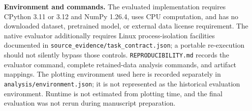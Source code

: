 \documentclass{article}
\begin{document}
\textbf{Environment and commands.} The evaluated implementation requires CPython 3.11 or 3.12 and NumPy 1.26.4, uses CPU computation, and has no downloaded dataset, pretrained model, or external data license requirement. The native evaluator additionally requires Linux process-isolation facilities documented in \texttt{source\_evidence/task\_contract.json}; a portable re-execution should not silently bypass those controls. \texttt{REPRODUCIBILITY.md} records the evaluator command, complete retained-data analysis commands, and artifact mappings. The plotting environment used here is recorded separately in \texttt{analysis/environment.json}; it is not represented as the historical evaluation environment. Runtime is not estimated from plotting time, and the final evaluation was not rerun during manuscript preparation. %
\end{document}

